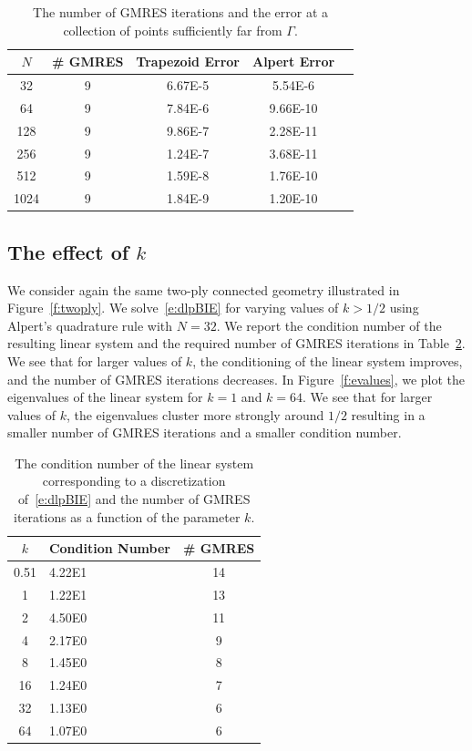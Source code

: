 \documentclass[final]{siamltex}
\begin{document}
\begin{table}[htps]
\centering
\begin{tabular}{c|cccc}
$N$ & \# GMRES & Trapezoid Error & Alpert Error  \\
\hline
32   & 9 & 6.67E-5 & 5.54E-6  \\
64   & 9 & 7.84E-6 & 9.66E-10 \\
128  & 9 & 9.86E-7 & 2.28E-11 \\
256  & 9 & 1.24E-7 & 3.68E-11 \\
512  & 9 & 1.59E-8 & 1.76E-10 \\  
1024 & 9 & 1.84E-9 & 1.20E-10 \\ 
\end{tabular}
\caption{\label{t:example1} The number of GMRES iterations and the
error at a collection of points sufficiently far from $\Gamma$.}
\end{table}

\subsection{The effect of $k$}
We consider again the same two-ply connected geometry illustrated in
Figure~\ref{f:twoply}.  We solve~\eqref{e:dlpBIE} for varying values of
$k > 1/2$ using Alpert's quadrature rule with $N=32$.  We report the
condition number of the resulting linear system and the required number
of GMRES iterations in Table~\ref{t:example2}.  We see that for larger
values of $k$, the conditioning of the linear system improves, and the
number of GMRES iterations decreases.  In Figure~\ref{f:evalues}, we
plot the eigenvalues of the linear system for $k=1$ and $k=64$.  We see
that for larger values of $k$, the eigenvalues cluster more strongly
around $1/2$ resulting in a smaller number of GMRES iterations and
a smaller condition number.

\begin{table}[htps]
\centering
\begin{tabular}{c>{\centering}m{2cm}c}
$k$ & Condition Number & \# GMRES \\
\hline
0.51 & 4.22E1 & 14 \\
1    & 1.22E1 & 13 \\
2    & 4.50E0 & 11 \\
4    & 2.17E0 & 9  \\
8    & 1.45E0 & 8  \\  
16   & 1.24E0 & 7  \\ 
32   & 1.13E0 & 6  \\
64   & 1.07E0 & 6  \\
\end{tabular}
\caption{\label{t:example2} The condition number of the linear system
corresponding to a discretization of~\eqref{e:dlpBIE} and the number of
GMRES iterations as a function of the parameter $k$.}
\end{table}
\end{document}

